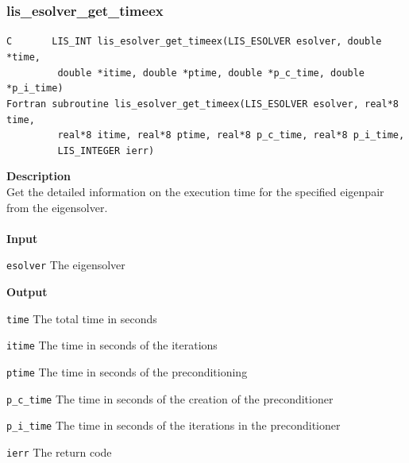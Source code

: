 \documentclass[a4paper]{article}
\newcommand{\namelistlabel}[1]{\mbox{#1}\hfill}
\newenvironment{namelist}[1]{%
\begin{list}{}
  {\let\makelabel\namelistlabel
  \settowidth{\labelwidth}{#1}
  \setlength{\leftmargin}{1.1\labelwidth}}
  }{%
\end{list}}
\begin{document}
\subsubsection{lis\_esolver\_get\_timeex}
\begin{screen}
\verb|C       LIS_INT lis_esolver_get_timeex(LIS_ESOLVER esolver, double *time,|\\
\verb|         double *itime, double *ptime, double *p_c_time, double *p_i_time)|\\
\verb|Fortran subroutine lis_esolver_get_timeex(LIS_ESOLVER esolver, real*8 time,|\\
\verb|         real*8 itime, real*8 ptime, real*8 p_c_time, real*8 p_i_time,|\\
\verb|         LIS_INTEGER ierr)|
\end{screen}
{\bf Description}\\
\indent
Get the detailed information on the execution time for the specified eigenpair from the eigensolver.
\\ \\
\noindent
{\bf Input}
\begin{namelist}{XXXXXXXXXXXXXXXXXXXX}
\item[\tt esolver] The eigensolver
\end{namelist}
{\bf Output}
\begin{namelist}{XXXXXXXXXXXXXXXXXXXX}
\item[\tt time] The total time in seconds
\item[\tt itime] The time in seconds of the iterations
\item[\tt ptime] The time in seconds of the preconditioning
\item[\tt p\_c\_time] The time in seconds of the creation of the preconditioner
\item[\tt p\_i\_time] The time in seconds of the iterations in the preconditioner
\item[\tt ierr] The return code
\end{namelist}
\end{document}
